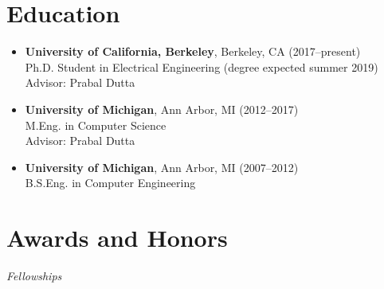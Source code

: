 \documentclass{article}
\begin{document}
%
%
%




\section*{Education}

\begin{itemize}
  \item[]
    \textbf{University of California, Berkeley}, Berkeley, CA (2017--present) \\
    Ph.D. Student in Electrical Engineering (degree expected summer 2019) \\
    Advisor: Prabal Dutta

  \item[]
    \textbf{University of Michigan}, Ann Arbor, MI (2012--2017) \\
    M.Eng. in Computer Science \\
    Advisor: Prabal Dutta

  \item[]
    \textbf{University of Michigan}, Ann Arbor, MI (2007--2012) \\
    B.S.Eng. in Computer Engineering
\end{itemize}




\section*{Awards and Honors}

\hspace{\parindent} \emph{Fellowships}
\end{document}

